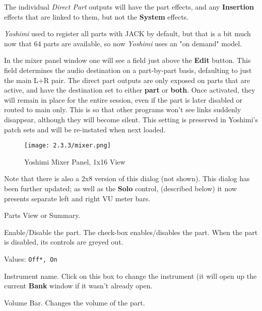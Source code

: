    The individual \textsl{Direct Part} outputs will have the part effects, and any
   \textbf{Insertion} effects that are linked to them, but not the
   \textbf{System} effects.

   \textsl{Yoshimi} used to register all parts with JACK by default, but that
   is a bit much now that 64 parts are available, so now \textsl{Yoshimi}
   uses an "on demand" model.

   In the mixer panel window one will see a field just above the
   \textbf{Edit} button.
   This field determines the audio destination on a part-by-part basis,
   defaulting to just the main L+R pair. The direct part outputs are only
   exposed on parts that are active, and have the destination set to either
   \textbf{part} or \textbf{both}.
   Once activated, they will remain in place for the entire session, even if
   the part is later disabled or routed to main only. This is so that other
   programs won't see links suddenly disappear, although they will become
   silent.  This setting is preserved in Yoshimi's patch sets and will be
   re-instated when next loaded.

\begin{figure}[H]
   \centering
   \texttt{[image: 2.3.3/mixer.png]}
   \caption[Yoshimi Mixer Panel]{Yoshimi Mixer Panel, 1x16 View}
   \label{fig:yoshimi_part_panel_1x16}
\end{figure}

   Note that there is also a 2x8 version of this dialog (not shown).
   This dialog has been further updated; as well as the \textbf{Solo}
   control, (described below) it now presents separate left and right
   VU meter bars.

   \setcounter{ItemCounter}{0}      %

   Parts View or Summary.

   Enable/Disable the part. The check-box enables/disables the part.
   When the part is disabled, its controls are greyed out.

   Values: \texttt{Off*, On}

   Instrument name. Click on this box to change the instrument (it will
   open up the current \textbf{Bank} window if it wasn't already open.

   Volume Bar.
   Changes the volume of the part.

